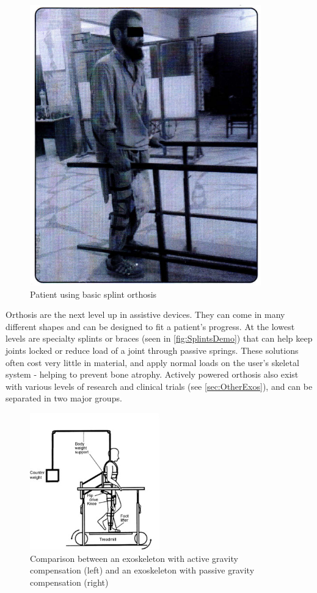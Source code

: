 \begin{figure} [h!]
    \centering
    \includegraphics[width=0.5\linewidth]{Figures/Background/SplintsDemo.png}
    \caption{Patient using basic splint orthosis \cite{RehabParaplegia}}
    \label{fig:SplintsDemo}
\end{figure}

Orthosis are the next level up in assistive devices. They can come in many different shapes and can be designed to fit a patient's progress. At the lowest levels are specialty splints or braces (seen in \autoref{fig:SplintsDemo}) that can help keep joints locked or reduce load of a joint through passive springs. These solutions often cost very little in material, and apply normal loads on the user's skeletal system - helping to prevent bone atrophy. Actively powered orthosis also exist with various levels of research and clinical trials (see \autoref{sec:OtherExos}), and can be separated in two major groups. 

\begin{figure}[h!]
    \centering
    \includegraphics[width=0.5\textwidth]{Figures/Background/ExoSeparateGravityComp.png}
    \caption{Comparison between an exoskeleton with active gravity compensation (left) and an exoskeleton with passive gravity compensation (right) \cite{GaitTrainingClinical}}
    \label{fig:ExoTypesGCSCompared}
\end{figure}

